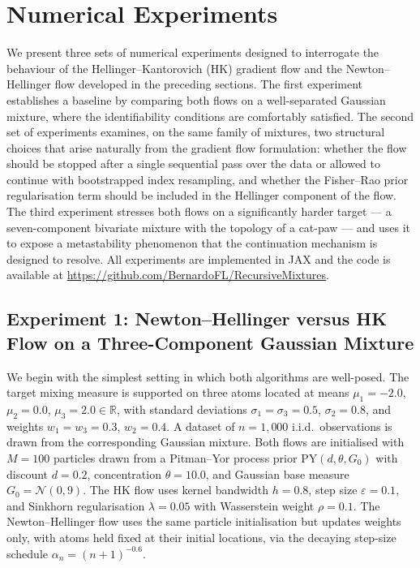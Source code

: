 
\section{Numerical Experiments}
\label{sec:experiments}

We present three sets of numerical experiments designed to interrogate the behaviour of the
Hellinger--Kantorovich (HK) gradient flow and the Newton--Hellinger flow developed in the
preceding sections.
The first experiment establishes a baseline by comparing both flows on a
well-separated Gaussian mixture, where the identifiability conditions are comfortably satisfied.
The second set of experiments examines, on the same family of mixtures, two
structural choices that arise naturally from the gradient flow formulation: whether the flow
should be stopped after a single sequential pass over the data or allowed to continue with
bootstrapped index resampling, and whether the Fisher--Rao prior regularisation term should be
included in the Hellinger component of the flow.
The third experiment stresses both flows on a significantly harder target --- a
seven-component bivariate mixture with the topology of a cat-paw --- and uses it to expose a
metastability phenomenon that the continuation mechanism is designed to resolve.
All experiments are implemented in JAX and the code is available at
\url{https://github.com/BernardoFL/RecursiveMixtures}.

\subsection{Experiment 1: Newton--Hellinger versus HK Flow on a
             Three-Component Gaussian Mixture}
\label{subsec:exp1}

We begin with the simplest setting in which both algorithms are well-posed.
The target mixing measure is supported on three atoms located at means
$\mu_1 = -2.0$, $\mu_2 = 0.0$, $\mu_3 = 2.0 \in \mathbb{R}$, with standard
deviations $\sigma_1 = \sigma_3 = 0.5$, $\sigma_2 = 0.8$, and weights
$w_1 = w_3 = 0.3$, $w_2 = 0.4$.
A dataset of $n = 1{,}000$ i.i.d.\ observations is drawn from the corresponding
Gaussian mixture.
Both flows are initialised with $M = 100$ particles drawn from a
Pitman--Yor process prior $\mathrm{PY}(d, \theta, G_0)$ with discount $d = 0.2$,
concentration $\theta = 10.0$, and Gaussian base measure $G_0 = \mathcal{N}(0, 9)$.
The HK flow uses kernel bandwidth $h = 0.8$, step size $\varepsilon = 0.1$,
and Sinkhorn regularisation $\lambda = 0.05$ with Wasserstein weight $\rho = 0.1$.
The Newton--Hellinger flow uses the same particle initialisation but updates weights
only, with atoms held fixed at their initial locations, via the decaying step-size
schedule $\alpha_n = (n+1)^{-0.6}$.

